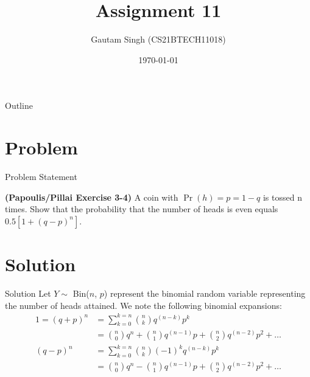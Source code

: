 \documentclass{beamer}
\title{Assignment 11}
\author{Gautam Singh (CS21BTECH11018)}
\date{\today}
\providecommand{\pr}[1]{\ensuremath{\Pr\left(#1\right)}}
\begin{document}
\begin{frame}
    \titlepage 
\end{frame}

\begin{frame}{Outline}
    \tableofcontents
\end{frame}


\section{Problem}
\begin{frame}{Problem Statement}

\textbf{(Papoulis/Pillai Exercise 3-4)} A coin with $\pr{h} = p = 1 - q$ is tossed n times. Show that the probability that the number
of heads is even equals $0.5[1 + (q - p)^n]$. 

\end{frame}


\section{Solution}

\begin{frame}{Solution}
    Let $Y \sim$ Bin($n$, $p$) represent the binomial random variable representing the number of heads attained. We note the following binomial expansions:
    \begin{align}
        1 = (q + p)^n &= \sum_{k = 0}^{k = n}\binom{n}{k}q^{(n - k)}p^k \\
        &= \binom{n}{0}q^n + \binom{n}{1}q^{(n - 1)}p + \binom{n}{2}q^{(n - 2)}p^2 + \ldots \label{eq:t1}\\
        (q - p)^n &= \sum_{k = 0}^{k = n}\binom{n}{k}(-1)^kq^{(n - k)}p^k \\
        &= \binom{n}{0}q^n - \binom{n}{1}q^{(n - 1)}p + \binom{n}{2}q^{(n - 2)}p^2 + \ldots \label{eq:t2}
    \end{align}
\end{frame}
\end{document}
